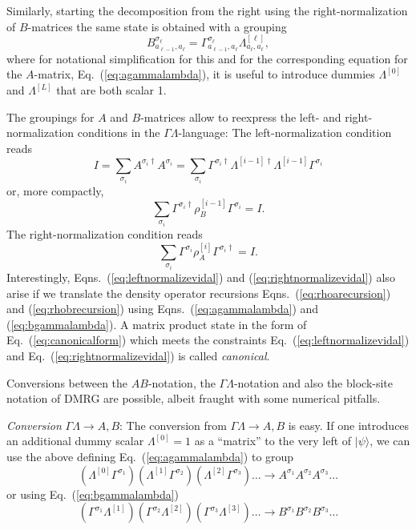 \documentclass[a4paper,10pt,oneside,onecolumn,1p,times]{elsarticle}
\newcommand{\ket}[1]{\mbox{$| #1  \rangle$}}
\begin{document}
Similarly, starting the decomposition from the right using the right-normalization of $B$-matrices the same state is obtained with a grouping
\begin{equation}
B^{\sigma_\ell}_{a_{\ell-1},a_{\ell}} = \Gamma^{\sigma_\ell}_{a_{\ell-1},a_\ell} \Lambda^{[\ell]}_{a_\ell,a_\ell} ,
\label{eq:bgammalambda}
\end{equation}
where for notational simplification for this and for the corresponding equation for the $A$-matrix, Eq.~(\ref{eq:agammalambda}), it is useful to introduce dummies $\Lambda^{[0]}$ and $\Lambda^{[L]}$ that are both scalar 1.

The groupings for $A$ and $B$-matrices allow to reexpress the left- and right-normalization conditions in the $\Gamma\Lambda$-language: The left-normalization condition reads 
\begin{equation}
I = \sum_{\sigma_i} A^{\sigma_i\dagger} A^{\sigma_i} = \sum_{\sigma_i} \Gamma^{\sigma_i\dagger} \Lambda^{[i-1]\dagger} \Lambda^{[i-1]} \Gamma^{\sigma_i}
\end{equation}
or, more compactly,
\begin{equation}
\sum_{\sigma_i}  \Gamma^{\sigma_i\dagger} \rho_B^{[i-1]} \Gamma^{\sigma_i} = I .
\label{eq:leftnormalizevidal}
\end{equation}
The right-normalization condition reads
\begin{equation}
\sum_{\sigma_i} \Gamma^{\sigma_i} \rho_A^{[i]} \Gamma^{\sigma_i\dagger} = I . 
\label{eq:rightnormalizevidal}
\end{equation}
Interestingly, Eqns.~(\ref{eq:leftnormalizevidal}) and (\ref{eq:rightnormalizevidal}) also arise if we translate the density operator recursions Eqns.~(\ref{eq:rhoarecursion}) and (\ref{eq:rhobrecursion}) using Eqns.~(\ref{eq:agammalambda}) and  (\ref{eq:bgammalambda}). 
A matrix product state in the form of Eq.~(\ref{eq:canonicalform}) which meets the constraints Eq.~(\ref{eq:leftnormalizevidal}) and Eq.~(\ref{eq:rightnormalizevidal}) is called {\em canonical}.

Conversions between the $AB$-notation, the $\Gamma\Lambda$-notation and also the block-site notation of DMRG are possible, albeit fraught with some numerical pitfalls.

{\em Conversion} $\Gamma\Lambda \rightarrow A,B$: The conversion from $\Gamma\Lambda \rightarrow A,B$ is easy. If one introduces an additional dummy scalar $\Lambda^{[0]} = 1$ as a ``matrix'' to the very left of $\ket{\psi}$, we can use the above defining Eq.~(\ref{eq:agammalambda}) to group 
\begin{equation}
(\Lambda^{[0]} \Gamma^{\sigma_1})
(\Lambda^{[1]} \Gamma^{\sigma_2})(\Lambda^{[2]} \Gamma^{\sigma_3})
 \ldots \rightarrow A^{\sigma_1}A^{\sigma_2}A^{\sigma_3}\ldots 
 \end{equation}
or using Eq.~(\ref{eq:bgammalambda}) 
\begin{equation}
(\Gamma^{\sigma_1}\Lambda^{[1]})
(\Gamma^{\sigma_2}\Lambda^{[2]} )(\Gamma^{\sigma_3}\Lambda^{[3]})
 \ldots \rightarrow B^{\sigma_1}B^{\sigma_2}B^{\sigma_3}\ldots 
 \end{equation}
\end{document}
